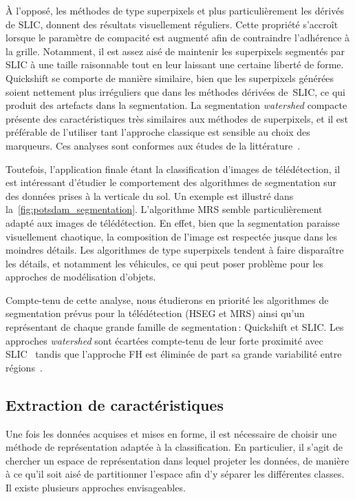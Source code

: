 À l'opposé, les méthodes de type superpixels et plus particulièrement les dérivés de \gls{SLIC}, donnent des résultats visuellement réguliers. Cette propriété s'accroît lorsque le paramètre de compacité est augmenté afin de contraindre l'adhérence à la grille. Notamment, il est assez aisé de maintenir les superpixels segmentés par \gls{SLIC} à une taille raisonnable tout en leur laissant une certaine liberté de forme. Quickshift se comporte de manière similaire, bien que les superpixels générées soient nettement plus irréguliers que dans les méthodes dérivées de~\gls{SLIC}, ce qui produit des artefacts dans la segmentation. La segmentation \emph{watershed} compacte présente des caractéristiques très similaires aux méthodes de superpixels, et il est préférable de l'utiliser tant l'approche classique est sensible au choix des marqueurs. Ces analyses sont conformes aux études de la littérature~\cite{neubert_superpixel_2012,achanta_slic_2012}.

Toutefois, l'application finale étant la classification d'images de télédétection, il est intéressant d'étudier le comportement des algorithmes de segmentation sur des données prises à la verticale du sol. Un exemple est illustré dans la~\cref{fig:potsdam_segmentation}. L'algorithme \gls{MRS} semble particulièrement adapté aux images de télédétection. En effet, bien que la segmentation paraisse visuellement chaotique, la composition de l'image est respectée jusque dans les moindres détails. Les algorithmes de type superpixels tendent à faire disparaître les détails, et notamment les véhicules, ce qui peut poser problème pour les approches de modélisation d'objets.

Compte-tenu de cette analyse, nous étudierons en priorité les algorithmes de segmentation prévus pour la télédétection (\gls{HSEG} et \gls{MRS}) ainsi qu'un représentant de chaque grande famille de segmentation\,: Quickshift et \gls{SLIC}. Les approches \emph{watershed} sont écartées compte-tenu de leur forte proximité avec \gls{SLIC}~\cite{neubert_compact_2014} tandis que l'approche \gls{FH} est éliminée de part sa grande variabilité entre régions~\cite{neubert_superpixel_2012}.

\subsection{Extraction de caractéristiques}

Une fois les données acquises et mises en forme, il est nécessaire de choisir une méthode de représentation adaptée à la classification. En particulier, il s'agit de chercher un espace de représentation dans lequel projeter les données, de manière à ce qu'il soit aisé de partitionner l'espace afin d'y séparer les différentes classes. Il existe plusieurs approches envisageables.


